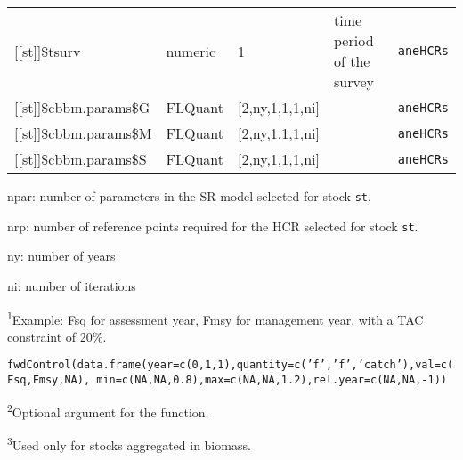 \begin{landscape}
\begin{table}[!ht]
\begin{footnotesize}
\begin{threeparttable}
\begin{tabular}{lllll}
        {[[st]]}\$tsurv & numeric & 1 & time period of the survey & \texttt{aneHCRs} \\
        {[[st]]}\$cbbm.params\$G & FLQuant & [2,ny,1,1,1,ni]  &  & \texttt{aneHCRs} \\
        {[[st]]}\$cbbm.params\$M & FLQuant & [2,ny,1,1,1,ni]  &  & \texttt{aneHCRs} \\
        {[[st]]}\$cbbm.params\$S & FLQuant & [2,ny,1,1,1,ni]  &  & \texttt{aneHCRs} \\
        \hline
      \end{tabular}

      \begin{tablenotes}
        \item npar: number of parameters in the SR model selected for stock \texttt{st}.
        \item nrp: number of reference points required for the HCR selected for stock \texttt{st}.
        \item ny: number of years
        \item ni: number of iterations
        \item \textsuperscript{1}Example: Fsq for assessment year, Fmsy for management year, with a TAC constraint of 20\%.
          \begin{center}
            \texttt{fwdControl(data.frame(year=c(0,1,1),quantity=c('f','f','catch'),val=c(Fsq,Fmsy,NA),
                                          min=c(NA,NA,0.8),max=c(NA,NA,1.2),rel.year=c(NA,NA,-1))}
          \end{center}
        \item \textsuperscript{2}Optional argument for the function.
        \item \textsuperscript{3}Used only for stocks aggregated in biomass.
      \end{tablenotes}

    \end{threeparttable}
  \end{footnotesize}

\end{table}        



\end{landscape}

